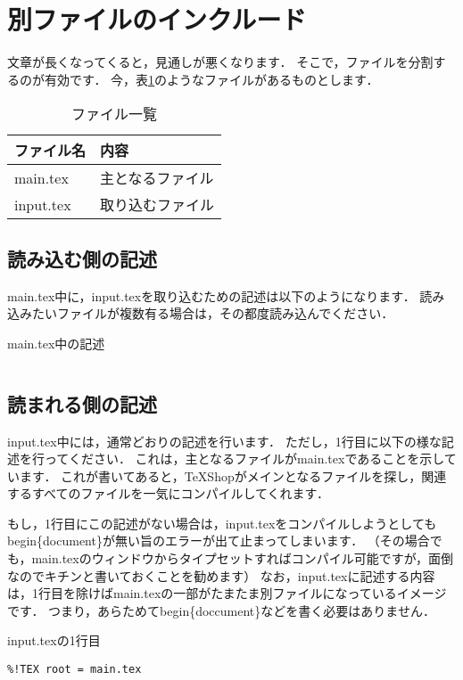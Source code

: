 
\section{別ファイルのインクルード}

文章が長くなってくると，見通しが悪くなります．
そこで，ファイルを分割するのが有効です．
今，表\ref{tab:filename}のようなファイルがあるものとします．

\begin{table}[h]
\caption{ファイル一覧}
\label{tab:filename}
\begin{center}
\begin{tabular}{l|l}
\hline
ファイル名 & 内容 \\ \hline
main.tex & 主となるファイル \\
input.tex & 取り込むファイル \\
\hline
\end{tabular}
\end{center}
\end{table}

\subsection{読み込む側の記述}
main.tex中に，input.texを取り込むための記述は以下のようになります．
読み込みたいファイルが複数有る場合は，その都度読み込んでください．

\begin{itembox}[c]{main.tex中の記述}
\begin{verbatim}

\end{verbatim}
\end{itembox}

\subsection{読まれる側の記述}
input.tex中には，通常どおりの記述を行います．
ただし，1行目に以下の様な記述を行ってください．
これは，主となるファイルがmain.texであることを示しています．
これが書いてあると，TeXShopがメインとなるファイルを探し，関連するすべてのファイルを一気にコンパイルしてくれます．

もし，1行目にこの記述がない場合は，input.texをコンパイルしようとしてもbegin\{document\}が無い旨のエラーが出て止まってしまいます．
（その場合でも，main.texのウィンドウからタイプセットすればコンパイル可能ですが，面倒なのでキチンと書いておくことを勧めます）
なお，input.texに記述する内容は，1行目を除けばmain.texの一部がたまたま別ファイルになっているイメージです．
つまり，あらためてbegin\{doccument\}などを書く必要はありません．

\begin{itembox}[c]{input.texの1行目}
\begin{verbatim}
%!TEX root = main.tex
\end{verbatim}
\end{itembox}

